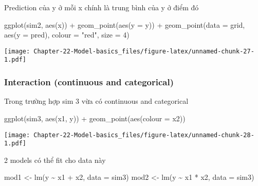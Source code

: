 \documentclass[
]{article}
\newenvironment{Shaded}{\begin{snugshade}}{\end{snugshade}}
\newcommand{\AttributeTok}[1]{\textcolor[rgb]{0.77,0.63,0.00}{#1}}
\newcommand{\DecValTok}[1]{\textcolor[rgb]{0.00,0.00,0.81}{#1}}
\newcommand{\FunctionTok}[1]{\textcolor[rgb]{0.00,0.00,0.00}{#1}}
\newcommand{\NormalTok}[1]{#1}
\newcommand{\OtherTok}[1]{\textcolor[rgb]{0.56,0.35,0.01}{#1}}
\newcommand{\SpecialCharTok}[1]{\textcolor[rgb]{0.00,0.00,0.00}{#1}}
\newcommand{\StringTok}[1]{\textcolor[rgb]{0.31,0.60,0.02}{#1}}
\begin{document}
Prediction của y ở mỗi x chính là trung bình của y ở điểm đó

\begin{Shaded}
\begin{Highlighting}[]
\FunctionTok{ggplot}\NormalTok{(sim2, }\FunctionTok{aes}\NormalTok{(x)) }\SpecialCharTok{+} 
  \FunctionTok{geom\_point}\NormalTok{(}\FunctionTok{aes}\NormalTok{(}\AttributeTok{y =}\NormalTok{ y)) }\SpecialCharTok{+}
  \FunctionTok{geom\_point}\NormalTok{(}\AttributeTok{data =}\NormalTok{ grid, }\FunctionTok{aes}\NormalTok{(}\AttributeTok{y =}\NormalTok{ pred), }\AttributeTok{colour =} \StringTok{"red"}\NormalTok{, }\AttributeTok{size =} \DecValTok{4}\NormalTok{)}
\end{Highlighting}
\end{Shaded}

\texttt{[image: Chapter-22-Model-basics\_files/figure-latex/unnamed-chunk-27-1.pdf]}

\hypertarget{interaction-continuous-and-categorical}{%
\subsubsection{Interaction (continuous and
categorical)}\label{interaction-continuous-and-categorical}}

Trong trường hợp sim 3 vừa có continuous and categorical

\begin{Shaded}
\begin{Highlighting}[]
\FunctionTok{ggplot}\NormalTok{(sim3, }\FunctionTok{aes}\NormalTok{(x1, y)) }\SpecialCharTok{+} 
  \FunctionTok{geom\_point}\NormalTok{(}\FunctionTok{aes}\NormalTok{(}\AttributeTok{colour =}\NormalTok{ x2))}
\end{Highlighting}
\end{Shaded}

\texttt{[image: Chapter-22-Model-basics\_files/figure-latex/unnamed-chunk-28-1.pdf]}

2 models có thể fit cho data này

\begin{Shaded}
\begin{Highlighting}[]
\NormalTok{mod1 }\OtherTok{\textless{}{-}} \FunctionTok{lm}\NormalTok{(y }\SpecialCharTok{\textasciitilde{}}\NormalTok{ x1 }\SpecialCharTok{+}\NormalTok{ x2, }\AttributeTok{data =}\NormalTok{ sim3)}
\NormalTok{mod2 }\OtherTok{\textless{}{-}} \FunctionTok{lm}\NormalTok{(y }\SpecialCharTok{\textasciitilde{}}\NormalTok{ x1 }\SpecialCharTok{*}\NormalTok{ x2, }\AttributeTok{data =}\NormalTok{ sim3)}
\end{Highlighting}
\end{Shaded}
\end{document}
